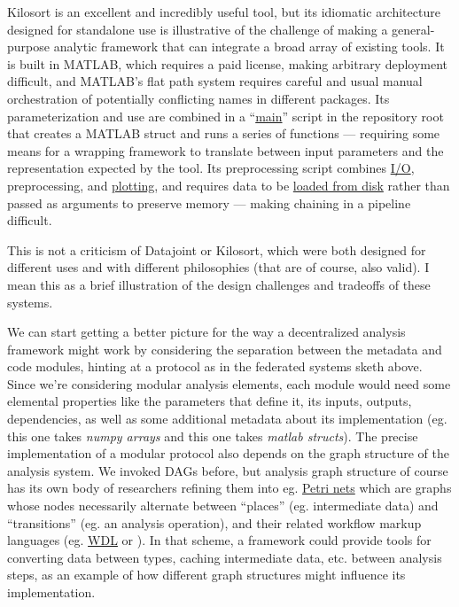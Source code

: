 \documentclass[10pt]{article}
\begin{document}
\begin{multicols}{2}
Kilosort is an excellent and incredibly useful tool, but its idiomatic
architecture designed for standalone use is illustrative of the
challenge of making a general-purpose analytic framework that can
integrate a broad array of existing tools. It is built in MATLAB, which
requires a paid license, making arbitrary deployment difficult, and
MATLAB's flat path system requires careful and usual manual
orchestration of potentially conflicting names in different packages.
Its parameterization and use are combined in a
``\href{https://github.com/MouseLand/Kilosort/blob/db3a3353d9a374ea2f71674bbe443be21986c82c/main_kilosort3.m}{main}''
script in the repository root that creates a MATLAB struct and runs a
series of functions --- requiring some means for a wrapping framework to
translate between input parameters and the representation expected by
the tool. Its preprocessing script combines
\href{https://github.com/MouseLand/Kilosort/blob/a1fccd9abf13ce5dc3340fae8050f9b1d0f8ab7a/preProcess/datashift.m\#L74-L77}{I/O},
preprocessing, and
\href{https://github.com/MouseLand/Kilosort/blob/a1fccd9abf13ce5dc3340fae8050f9b1d0f8ab7a/preProcess/datashift.m\#L57-L68}{plotting},
and requires data to be
\href{https://github.com/MouseLand/Kilosort/blob/a1fccd9abf13ce5dc3340fae8050f9b1d0f8ab7a/preProcess/preprocessDataSub.m\#L82-L84}{loaded
from disk} rather than passed as arguments to preserve memory --- making
chaining in a pipeline difficult.

This is not a criticism of Datajoint or Kilosort, which were both
designed for different uses and with different philosophies (that are of
course, also valid). I mean this as a brief illustration of the design
challenges and tradeoffs of these systems.

We can start getting a better picture for the way a decentralized
analysis framework might work by considering the separation between the
metadata and code modules, hinting at a protocol as in the federated
systems sketh above. Since we're considering modular analysis elements,
each module would need some elemental properties like the parameters
that define it, its inputs, outputs, dependencies, as well as some
additional metadata about its implementation (eg. this one takes
\emph{numpy arrays} and this one takes \emph{matlab structs}). The
precise implementation of a modular protocol also depends on the graph
structure of the analysis system. We invoked DAGs before, but analysis
graph structure of course has its own body of researchers refining them
into eg. \href{https://en.wikipedia.org/wiki/Petri_net}{Petri nets}
which are graphs whose nodes necessarily alternate between ``places''
(eg. intermediate data) and ``transitions'' (eg. an analysis operation),
and their related workflow markup languages (eg.
\href{https://openwdl.org/}{WDL} or \cite{vanderaalstYAWLAnotherWorkflow2005} ). In that scheme, a framework
could provide tools for converting data between types, caching
intermediate data, etc. between analysis steps, as an example of how
different graph structures might influence its implementation.


\end{multicols}
\end{document}
